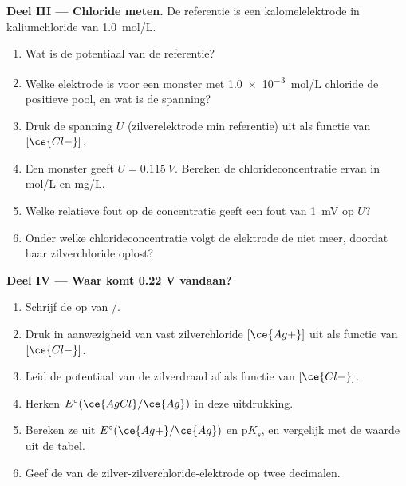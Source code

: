 \begin{problem}
\medskip
\noindent\textbf{Deel III --- Chloride meten.}
De referentie is een kalomelelektrode in kaliumchloride van
\qty{1.0}{mol/L}.
\begin{enumerate}[resume]
  \item Wat is de potentiaal van de referentie?
  \item Welke elektrode is voor een monster met \qty{1.0e-3}{mol/L}
        chloride de positieve pool, en wat is de spanning?
  \item Druk de spanning $U$ (zilverelektrode min referentie) uit als
        functie van $[\ce{Cl-}]$.
  \item Een monster geeft $U = \qty{0.115}{V}$. Bereken de
        chlorideconcentratie ervan in \unit{mol/L} en \unit{mg/L}.
  \item Welke relatieve fout op de concentratie geeft een fout van
        \qty{1}{mV} op $U$?
  \item Onder welke chlorideconcentratie volgt de elektrode de
         niet meer, doordat haar zilverchloride
        oplost?
\end{enumerate}

\medskip
\noindent\textbf{Deel IV --- Waar komt 0.22 V vandaan?}
\begin{enumerate}[resume]
  \item Schrijf de  op van /.
  \item Druk in aanwezigheid van vast zilverchloride $[\ce{Ag+}]$ uit als
        functie van $[\ce{Cl-}]$.
  \item Leid de potentiaal van de zilverdraad af als functie van
        $[\ce{Cl-}]$.
  \item Herken $E^\circ(\ce{AgCl}/\ce{Ag})$ in deze uitdrukking.
  \item Bereken ze uit $E^\circ(\ce{Ag+}/\ce{Ag})$ en $\mathrm{p}K_s$, en
        vergelijk met de waarde uit de tabel.
  \item Geef de  van de zilver-zilverchloride-elektrode
        op twee decimalen.
\end{enumerate}
\end{problem}
